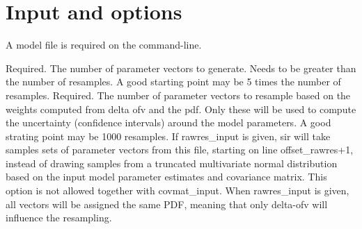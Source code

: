 \section{Input and options}
A model file is required on the command-line. 
\begin{optionlist}
Required. The number of parameter vectors to generate. Needs to be greater than the number of resamples. A good starting point may be 5 times the number of resamples.
\nextopt
{}
Required. The number of parameter vectors to resample based on the weights
computed from delta ofv and the pdf. Only these will be used to compute the uncertainty (confidence intervals) around the model parameters. A good strating point may be 1000 resamples.
\nextopt
{}
If rawres\_input is given, sir will take samples sets of parameter
vectors from this file, starting on line offset\_rawres+1, instead of
drawing samples from a truncated multivariate normal distribution 
based on the input model parameter estimates and 
covariance matrix.
This option is not allowed together with covmat\_input. 
When rawres\_input is given, all vectors will be assigned the same PDF, meaning that only delta-ofv will influence the resampling.


\end{optionlist}
